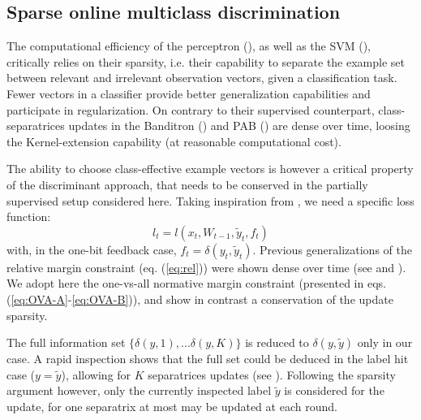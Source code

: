 \documentclass[preprint,12pt,authoryear]{elsarticle}
\begin{document}
\subsection{Sparse online multiclass discrimination}\label{sec:sparse-online-multiclass-discrimination}

%



The computational efficiency of the perceptron (\cite{rosenblatt1958perceptron}), as well as the SVM (\cite{vapnik1998statistical}),  critically relies on their sparsity, i.e. their capability to separate the example  set between relevant and irrelevant observation vectors, given a classification task. Fewer vectors in a classifier provide better generalization capabilities and participate in regularization.
On contrary to their supervised counterpart, class-separatrices updates in the Banditron (\cite{kakade2008efficient}) and PAB (\cite{zhong2015esann}) are dense over time, loosing the Kernel-extension capability (at reasonable computational cost). 

The ability to choose class-effective example vectors is however  a critical property of the discriminant approach, that needs to be conserved in the partially supervised setup considered here. 
Taking inspiration from \cite{crammer2006online}, we need a specific loss function:
$$l_t = l(x_t,W_{t-1},\tilde{y}_t,f_t)$$
with, in the one-bit feedback  case, $f_t = \delta(y_t,\tilde{y}_t)$. Previous generalizations of the relative margin constraint (eq. (\ref{eq:rel})) were shown dense over time (see \cite{kakade2008efficient} and \cite{zhong2015esann}). We adopt here the one-vs-all normative margin constraint (presented in eqs.(\ref{eq:OVA-A}-\ref{eq:OVA-B})), %
and show in contrast a conservation of the update sparsity.

The full information set $\{\delta(y,1), ... \delta(y,K)\}$ is reduced to $\delta(y,\tilde{y})$ only in our case. 
A rapid inspection shows that the full set could be deduced in the label hit case ($y = \tilde{y}$), allowing for $K$ separatrices updates (see \cite{chen2009beyond}). Following the sparsity argument however,
only the  currently inspected label $\tilde{y}$ is  considered  for the update, for one separatrix at most may be updated at each round. 
\end{document}

